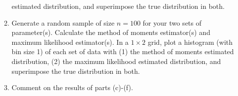 \documentclass{article}\usepackage[]{graphicx}\usepackage[]{color}
\begin{document}
\begin{enumerate}
\begin{enumerate}
  estimated distribution, and superimpose the true distribution in both.
  \item Generate a random sample of size $n=100$ for your two sets of parameter(s).
  Calculate the method of moments estimator(s) and maximum likelihood estimator(s).
  In a $1 \times 2$ grid, plot a histogram (with bin size 1) of each set of data 
  with (1) the method of moments estimated distribution, (2) the maximum likelihood
  estimated distribution, and superimpose the true distribution in both.
  \item Comment on the results of parts (c)-(f). 
\end{enumerate}
\end{enumerate}%
\newpage

\end{document}
